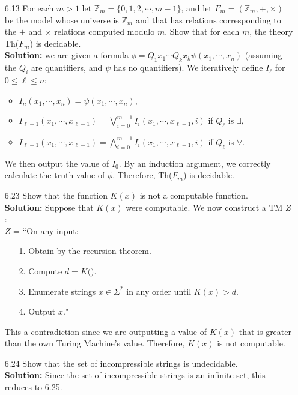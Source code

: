 \begin{enumerate}
\item[6.13]For each $m > 1$ let $\mathbb{Z}_m = \{0,1,2,\cdots,m-1\}$, and let $F_m = (\mathbb{Z}_m, +, \times)$ be the model whose universe is $\mathbb{Z}_m$ and that has relations corresponding to the $+$ and $\times$ relations computed modulo $m$. Show that for each $m$, the theory Th($F_m$) is decidable.
\\
\textbf{Solution:} we are given a formula $\phi = Q_1x_1\cdots Q_kx_k \psi(x_1, \cdots, x_n)$ (assuming the $Q_i$ are quantifiers, and $\psi$ has no quantifiers). We iteratively define $I_\ell$ for $0 \le \ell \le n$:
\begin{itemize}
\item $I_n(x_1, \cdots, x_n) = \psi(x_1, \cdots, x_n)$,
\item $I_{\ell-1}(x_1, \cdots, x_{\ell-1}) = \bigvee_{i=0}^{m-1} I_{i}(x_1, \cdots, x_{\ell-1}, i)$ if $Q_\ell$ is $\exists$,
\item $I_{\ell-1}(x_1, \cdots, x_{\ell-1}) = \bigwedge_{i=0}^{m-1} I_{i}(x_1, \cdots, x_{\ell-1}, i)$ if $Q_\ell$ is $\forall$.
\end{itemize}
We then output the value of $I_0$. By an induction argument, we correctly calculate the truth value of $\phi$. Therefore, Th($F_m$) is decidable. 


\item[6.23]Show that the function $K(x)$ is not a computable function.
\\
\textbf{Solution:} Suppose that $K(x)$ were computable. We now construct a TM $Z$:
\\
$Z$ = ``On any input:
\begin{enumerate}
\itemsep0em
\item[1.]Obtain  by the recursion theorem.
\item[2.]Compute $d = K($$)$.
\item[3.]Enumerate strings $x \in \Sigma^*$ in any order until $K(x) > d$.
\item[4.]Output $x$."
\end{enumerate}
This a contradiction since we are outputting a value of $K(x)$ that is greater than the own Turing Machine's value. Therefore, $K(x)$ is not computable.

\item[6.24]Show that the set of incompressible strings is undecidable.
\\
\textbf{Solution:} Since the set of incompressible strings is an infinite set, this reduces to 6.25.


\end{enumerate}
